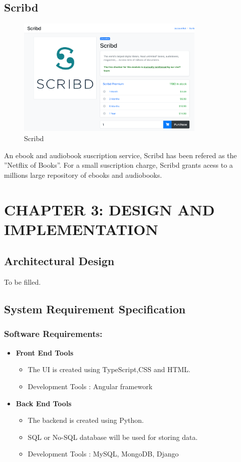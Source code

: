 \documentclass[12pt]{article}
\begin{document}
\subsection{Scribd}
\begin{figure}[h]
    \centerline{\includegraphics[width = 90mm]{scribd.png}}
    \caption{Scribd}
    \label{fig}
\end{figure}
An ebook and audiobook suscription service, Scribd has been refered as the ”Netflix of Books”. For
a small suscription charge, Scribd grants acess to a millions large repository of ebooks and audiobooks.

\clearpage

\section{CHAPTER 3: DESIGN AND IMPLEMENTATION}
\subsection{Architectural Design}
To be filled.
\clearpage
\subsection{System Requirement Specification}
\subsubsection{Software Requirements:}
\begin{itemize}
    \item \textbf{Front End Tools}
        \begin{itemize}
            \item The UI is created using TypeScript,CSS and HTML.
            \item Development Tools : Angular framework
        \end{itemize}
    \item \textbf{Back End Tools}
        \begin{itemize}
            \item The backend is created using Python.
            \item SQL or No-SQL database will be used for storing data.
            \item Development Tools : MySQL, MongoDB, Django
        \end{itemize}
\end{itemize}
\end{document}
